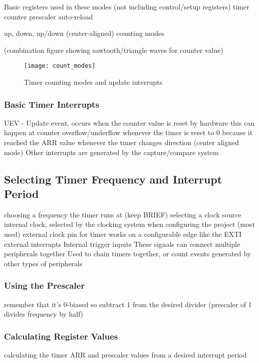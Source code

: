\documentclass[11pt,fleqn]{book} %
\begin{document}
    Basic registers used in these modes (not including control/setup registers)
        timer counter
        prescaler 
        auto-reload
    
    up, down, up/down (center-aligned) counting modes
    
    (combination figure showing sawtooth/triangle waves for counter value)
    \begin{figure}[]
        \centering\texttt{[image: count\_modes]}
        \caption{Timer counting modes and update interrupts}
        \label{count_modes}
    \end{figure}
    
    \subsubsection{Basic Timer Interrupts}
    UEV - Update event, occurs when the counter value is reset by hardware
        this can happen at counter overflow/underflow
        whenever the timer is reset to 0 because it reached the ARR value
        whenever the timer changes direction (center aligned mode)
    Other interrupts are generated by the capture/compare system
    
    \subsection{Selecting Timer Frequency and Interrupt Period}	
    choosing a frequency the timer runs at (keep BRIEF)
    selecting a clock source
        internal clock, selected by the clocking system when configuring the project (most used)
        external clock pin for timer
            works on a configurable edge like the EXTI external interrupts
        Internal trigger inputs
            These signals can connect multiple peripherals together
            Used to chain timers together, or count events generated by other types of peripherals
    
    \subsubsection{Using the Prescaler}
        remember that it's 0-biased so subtract 1 from the desired divider
        (prescaler of 1 divides frequency by half)
    
    \subsubsection{Calculating Register Values}
        calculating the timer ARR and prescaler values from a desired interrupt period 
        	
\end{document}
